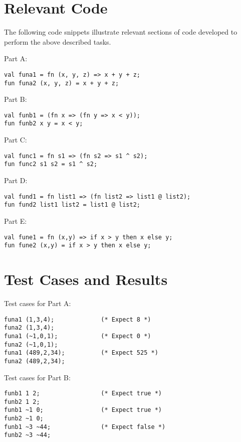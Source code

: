 \documentclass[letterpaper]{report}
\begin{document}
\section{Relevant Code}
\label{sec:problem-statement}

The following code snippets illustrate relevant sections of code developed to perform the above described tasks.\newline 

Part A:
\begin{lstlisting}
val funa1 = fn (x, y, z) => x + y + z;
fun funa2 (x, y, z) = x + y + z;
\end{lstlisting}

Part B:
\begin{lstlisting}
val funb1 = (fn x => (fn y => x < y)); 
fun funb2 x y = x < y;
\end{lstlisting}

Part C:
\begin{lstlisting}
val func1 = fn s1 => (fn s2 => s1 ^ s2);
fun func2 s1 s2 = s1 ^ s2;
\end{lstlisting}

Part D:
\begin{lstlisting}
val fund1 = fn list1 => (fn list2 => list1 @ list2);
fun fund2 list1 list2 = list1 @ list2;
\end{lstlisting}

Part E:
\begin{lstlisting}
val fune1 = fn (x,y) => if x > y then x else y;
fun fune2 (x,y) = if x > y then x else y;
\end{lstlisting}


\section{Test Cases and Results}
\label{sec:tests}

\vspace{12px}
\indent Test cases for Part A:
\begin{lstlisting}
funa1 (1,3,4);             (* Expect 8 *)
funa2 (1,3,4);
funa1 (~1,0,1);            (* Expect 0 *)
funa2 (~1,0,1);
funa1 (489,2,34);          (* Expect 525 *)
funa2 (489,2,34);
\end{lstlisting}



Test cases for Part B:
\begin{lstlisting}
funb1 1 2;                 (* Expect true *)
funb2 1 2;
funb1 ~1 0;                (* Expect true *)
funb2 ~1 0;
funb1 ~3 ~44;              (* Expect false *)
funb2 ~3 ~44;
\end{lstlisting}
\end{document}
